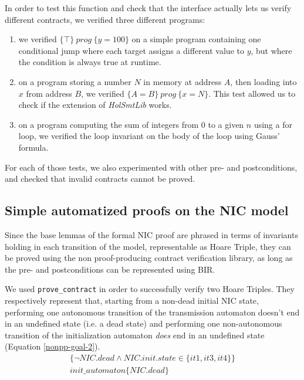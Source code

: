 \documentclass[10pt,a4paper]{article}
\newcommand{\htriple}[3]{\ensuremath{\{#1\}~#2~\{#3\}}}
\begin{document}
\begin{multicols}{2}
In order to test this function and check that the interface actually lets us verify different contracts, we verified three different programs:

\begin{enumerate}
  \item we verified \htriple{\top}{prog}{y = 100} on a simple program containing one conditional jump where each target assigns a different value to $y$, but where the condition is always true at runtime.
  \item on a program storing a number $N$ in memory at address $A$, then loading into $x$ from address $B$, we verified \htriple{A=B}{prog}{x=N}. This test allowed us to check if the extension of \textit{HolSmtLib} works.
  \item on a program computing the sum of integers from $0$ to a given $n$ using a for loop, we verified the loop invariant on the body of the loop using Gauss' formula.
\end{enumerate}

For each of those tests, we also experimented with other pre- and postconditions, and checked that invalid contracts cannot be proved.

\subsection{Simple automatized proofs on the NIC model} \label{simple-automated-proofs-on-nic}

Since the base lemmas of the formal NIC proof are phrased in terms of invariants holding in each transition of the model, representable as Hoare Triple, they can be proved using the non proof-producing contract verification library, as long as the pre- and postconditions can be represented using BIR.

We used \texttt{prove\_contract} in order to successfully verify two Hoare Triples. They respectively represent that, starting from a non-dead initial NIC state, performing one autonomous transition of the transmission automaton doesn't end in an undefined state (i.e. a dead state) and performing one non-autonomous transition of the initialization automaton \textit{does} end in an undefined state (Equation \ref{nonpp-goal-2}).
%
\begin{multline}
	\{\neg NIC.dead \land NIC.init.state \in \{it1,it3,it4\}\}\\
	init\_automaton\{NIC.dead\}
    \label{nonpp-goal-2}
\end{multline}


\end{multicols}
\end{document}
